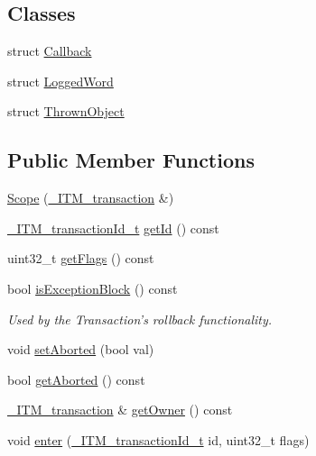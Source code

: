 \subsection*{Classes}
\begin{DoxyCompactItemize}
\item 
struct \hyperlink{structitm2stm_1_1Scope_1_1Callback}{Callback}
\item 
struct \hyperlink{structitm2stm_1_1Scope_1_1LoggedWord}{Logged\-Word}
\item 
struct \hyperlink{structitm2stm_1_1Scope_1_1ThrownObject}{Thrown\-Object}
\end{DoxyCompactItemize}
\subsection*{Public Member Functions}
\begin{DoxyCompactItemize}
\item 
\hyperlink{classitm2stm_1_1Scope_a4ab68c623441fe7379f2c1b337369b8a}{Scope} (\hyperlink{libitm_8h_a65d3a93d285fdbde408558d6b431abc8}{\-\_\-\-I\-T\-M\-\_\-transaction} \&)
\item 
\hyperlink{libitm_8h_a560abc8cf0e1499368b0cc014ee8bd60}{\-\_\-\-I\-T\-M\-\_\-transaction\-Id\-\_\-t} \hyperlink{classitm2stm_1_1Scope_a8966636a58bede610733df011aae9132}{get\-Id} () const 
\item 
uint32\-\_\-t \hyperlink{classitm2stm_1_1Scope_ae5870653f4f1b00e86032032c9afb1de}{get\-Flags} () const 
\item 
bool \hyperlink{classitm2stm_1_1Scope_afb29bce9f1b2dfc7592786573b8ddd3a}{is\-Exception\-Block} () const 
\begin{DoxyCompactList}\small\item\em Used by the Transaction's rollback functionality. \end{DoxyCompactList}\item 
void \hyperlink{classitm2stm_1_1Scope_a8c2257d0193bdc65db0ec6fa73404de6}{set\-Aborted} (bool val)
\item 
bool \hyperlink{classitm2stm_1_1Scope_aafa0881cc120ecc8e83b3444ef751c8b}{get\-Aborted} () const 
\item 
\hyperlink{libitm_8h_a65d3a93d285fdbde408558d6b431abc8}{\-\_\-\-I\-T\-M\-\_\-transaction} \& \hyperlink{classitm2stm_1_1Scope_a857bd1a6cf706416b370194501800e87}{get\-Owner} () const 
\item 
void \hyperlink{classitm2stm_1_1Scope_a6cabd0217e36366f00b0ace465208dd2}{enter} (\hyperlink{libitm_8h_a560abc8cf0e1499368b0cc014ee8bd60}{\-\_\-\-I\-T\-M\-\_\-transaction\-Id\-\_\-t} id, uint32\-\_\-t flags)

\end{DoxyCompactItemize}
